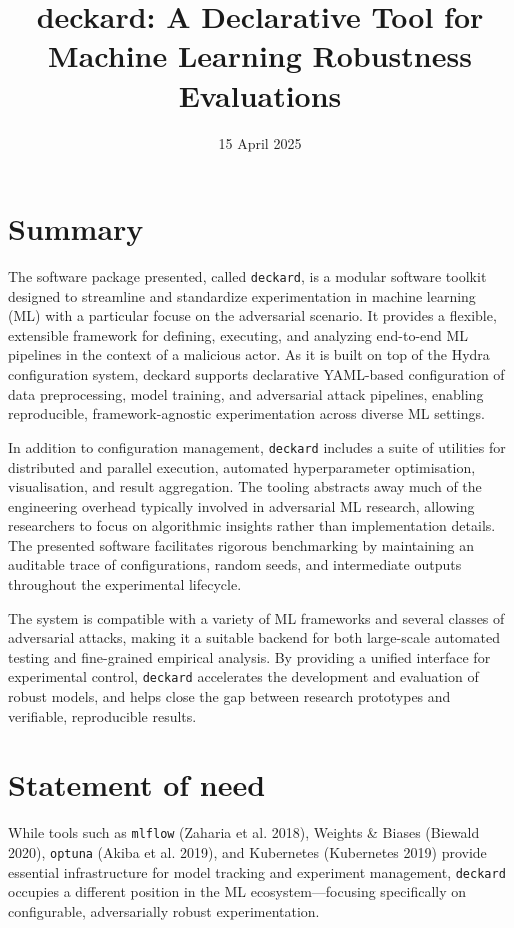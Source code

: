 \documentclass[
]{article}
\title{deckard: A Declarative Tool for Machine Learning Robustness
Evaluations}
\author{}
\date{\vspace{-2.5em}15 April 2025}
\begin{document}
\maketitle

\hypertarget{summary}{%
\section{Summary}\label{summary}}

The software package presented, called \texttt{deckard}, is a modular
software toolkit designed to streamline and standardize experimentation
in machine learning (ML) with a particular focuse on the adversarial
scenario. It provides a flexible, extensible framework for defining,
executing, and analyzing end-to-end ML pipelines in the context of a
malicious actor. As it is built on top of the Hydra configuration
system, deckard supports declarative YAML-based configuration of data
preprocessing, model training, and adversarial attack pipelines,
enabling reproducible, framework-agnostic experimentation across diverse
ML settings.

In addition to configuration management, \texttt{deckard} includes a
suite of utilities for distributed and parallel execution, automated
hyperparameter optimisation, visualisation, and result aggregation. The
tooling abstracts away much of the engineering overhead typically
involved in adversarial ML research, allowing researchers to focus on
algorithmic insights rather than implementation details. The presented
software facilitates rigorous benchmarking by maintaining an auditable
trace of configurations, random seeds, and intermediate outputs
throughout the experimental lifecycle.

The system is compatible with a variety of ML frameworks and several
classes of adversarial attacks, making it a suitable backend for both
large-scale automated testing and fine-grained empirical analysis. By
providing a unified interface for experimental control, \texttt{deckard}
accelerates the development and evaluation of robust models, and helps
close the gap between research prototypes and verifiable, reproducible
results.

\hypertarget{statement-of-need}{%
\section{Statement of need}\label{statement-of-need}}

While tools such as \texttt{mlflow} (Zaharia et al. 2018), Weights \&
Biases (Biewald 2020), \texttt{optuna} (Akiba et al. 2019), and
Kubernetes (Kubernetes 2019) provide essential infrastructure for model
tracking and experiment management, \texttt{deckard} occupies a
different position in the ML ecosystem---focusing specifically on
configurable, adversarially robust experimentation.
\end{document}
